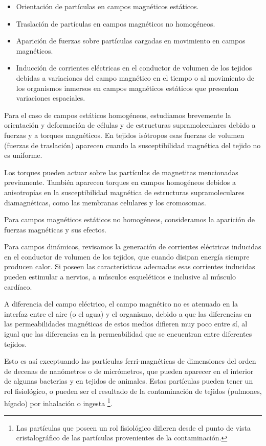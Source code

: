 \begin{itemize}
	\item Orientación de partículas en campos magnéticos estáticos.
	
	\item Traslación de partículas en campos magnéticos no homogéneos.
	
	\item Aparición de fuerzas sobre partículas cargadas en movimiento en campos magnéticos.
	
	\item Inducción de corrientes eléctricas en el conductor de volumen de los tejidos debidas a variaciones del campo magnético en el tiempo o al movimiento de los organismos inmersos en campos magnéticos estáticos que presentan variaciones espaciales.

\end{itemize}

Para el caso de campos estáticos homogéneos, estudiamos brevemente la orientación y deformación de células y de estructuras supramoleculares debido a fuerzas y a torques magnéticos. En tejidos isótropos esas fuerzas de volumen (fuerzas de traslación) aparecen cuando la susceptibilidad magnética del tejido no es uniforme.

Los torques pueden actuar sobre las partículas de magnetitas mencionadas previamente. También aparecen torques en campos homogéneos debidos a anisotropías en la susceptibilidad magnética de estructuras supramoleculares diamagnéticas, como las membranas celulares y los cromosomas.

Para campos magnéticos estáticos no homogéneos, consideramos la aparición de fuerzas magnéticas y sus efectos.

Para campos dinámicos, revisamos la generación de corrientes eléctricas inducidas en el conductor de volumen de los tejidos, que cuando disipan energía siempre producen calor. Si poseen las características adecuadas esas corrientes inducidas pueden estimular a nervios, a músculos esqueléticos e inclusive al músculo cardíaco.

A diferencia del campo eléctrico, el campo magnético no es atenuado en la interfaz entre el aire (o el agua) y el organismo, debido a que las diferencias en las permeabilidades magnéticas de estos medios difieren muy poco entre sí, al igual que las diferencias en la permeabilidad que se encuentran entre diferentes tejidos.

Esto es así exceptuando las partículas ferri-magnéticas de dimensiones del orden de decenas de nanómetros o de micrómetros, que pueden aparecer en el interior de algunas bacterias y en tejidos de animales. Estas partículas pueden tener un rol fisiológico, o pueden ser el resultado de la contaminación de tejidos (pulmones, hígado) por inhalación o ingesta \footnote{Las partículas que poseen un rol fisiológico difieren desde el punto de vista cristalográfico de las partículas provenientes de la contaminación.}. 

